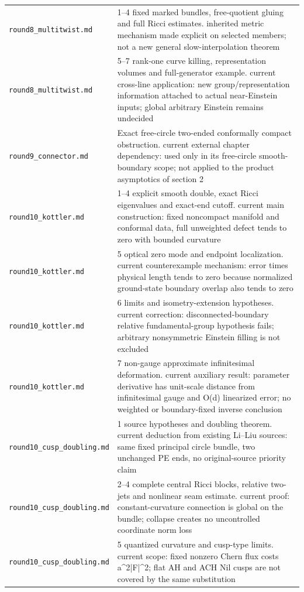 \documentclass[UTF8,fontset=fandol,zihao=-4]{ctexart}
\theoremstyle{cn}
\begin{document}
\begin{longtable}{L{.34\textwidth}L{.59\textwidth}}
\nolinkurl{round8_multitwist.md} & 1–4 fixed marked bundles, free-quotient gluing and full Ricci estimates. inherited metric mechanism made explicit on selected members; not a new general slow-interpolation theorem\\
\nolinkurl{round8_multitwist.md} & 5–7 rank-one curve killing, representation volumes and full-generator example. current cross-line application: new group/representation information attached to actual near-Einstein inputs; global arbitrary Einstein remains undecided\\
\nolinkurl{round9_connector.md} & Exact free-circle two-ended conformally compact obstruction. current external chapter dependency: used only in its free-circle smooth-boundary scope; not applied to the product asymptotics of section 2\\
\nolinkurl{round10_kottler.md} & 1–4 explicit smooth double, exact Ricci eigenvalues and exact-end cutoff. current main construction: fixed noncompact manifold and conformal data, full unweighted defect tends to zero with bounded curvature\\
\nolinkurl{round10_kottler.md} & 5 optical zero mode and endpoint localization. current counterexample mechanism: error times physical length tends to zero because normalized ground-state boundary overlap also tends to zero\\
\nolinkurl{round10_kottler.md} & 6 limits and isometry-extension hypotheses. current correction: disconnected-boundary relative fundamental-group hypothesis fails; arbitrary nonsymmetric Einstein filling is not excluded\\
\nolinkurl{round10_kottler.md} & 7 non-gauge approximate infinitesimal deformation. current auxiliary result: parameter derivative has unit-scale distance from infinitesimal gauge and O(d) linearized error; no weighted or boundary-fixed inverse conclusion\\
\nolinkurl{round10_cusp_doubling.md} & 1 source hypotheses and doubling theorem. current deduction from existing Li–Liu sources: same fixed principal circle bundle, two unchanged PE ends, no original-source priority claim\\
\nolinkurl{round10_cusp_doubling.md} & 2–4 complete central Ricci blocks, relative two-jets and nonlinear seam estimate. current proof: constant-curvature connection is global on the bundle; collapse creates no uncontrolled coordinate norm loss\\
\nolinkurl{round10_cusp_doubling.md} & 5 quantized curvature and cusp-type limits. current scope: fixed nonzero Chern flux costs a\textasciicircum{}2|F|\textasciicircum{}2; flat AH and ACH Nil cusps are not covered by the same substitution\\

\end{longtable}
\end{document}
